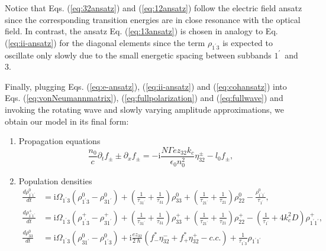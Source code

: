 \documentclass[10pt]{article}
\begin{document}
			Notice that Eqs. (\ref{eq:32ansatz}) and (\ref{eq:12ansatz}) follow the
			electric field ansatz since the corresponding transition energies are in close
			resonance with the optical field. In contrast, the ansatz Eq.
			(\ref{eq:13ansatz}) is chosen in analogy to Eq. (\ref{eq:ii-ansatz}) for the
			diagonal elements since the term $\rho_{1^{\prime}3}$ is expected to oscillate
			only slowly due to the small energetic spacing between subbands $1^{\prime}%
			$\ and $3$.
				
			Finally, plugging Eqs. (\ref{eq:e-ansatz}), (\ref{eq:ii-ansatz}) and
			(\ref{eq:cohansatz}) into Eqs. (\ref{eq:vonNeumannmatrix}),
			(\ref{eq:fullpolarization}) and (\ref{eq:fullwave}) and invoking the rotating
			wave and slowly varying amplitude approximations, we obtain our model in its
			final form:			
\begin{enumerate}
\item {Propagation equations}
\begin{equation}
\frac{n_{0}}{c}\partial_{t}f_{\pm}\pm\partial_{x}f_{\pm}=-\mathrm{i}%
\frac{N\Gamma ez_{32}k_{c}}{\epsilon_{0}n_{0}^{2}}\eta_{32}^{\pm}-l_{0}f_{\pm
}, \label{eq:rtwave}%
\end{equation}
\item { Population densities}%
\begin{subequations}
\label{eq:diagonaldm}%
\begin{align}
\frac{d\rho_{1^{\prime}1^{\prime}}^{0}}{dt} &= \mathrm{i}\Omega_{1^{\prime}%
3}\left(  \rho_{1^{\prime}3}^{0}-\rho_{31^{\prime}}^{0}\right)  +\left(
\frac{1}{\tau_{31^{\prime}}}+\frac{1}{\tau_{31}}\right)  \rho_{33}^{0}+\left(
\frac{1}{\tau_{21^{\prime}}}+\frac{1}{\tau_{21}}\right)  \rho_{22}^{0}%
-\frac{\rho_{1^{\prime}1^{\prime}}^{0}}{\tau_{1^{\prime}}},\label{eq:rho11-dm} \\
\frac{d\rho_{1^{\prime}1^{\prime}}^{+}}{dt} &= \mathrm{i}\Omega_{1^{\prime}%
3}\left(  \rho_{1^{\prime}3}^{+}-\rho_{31^{\prime}}^{+}\right)  +\left(
\frac{1}{\tau_{31^{\prime}}}+\frac{1}{\tau_{31}}\right)  \rho_{33}^{+}+\left(
\frac{1}{\tau_{21^{\prime}}}+\frac{1}{\tau_{21}}\right)  \rho_{22}^{+}-\left(
\frac{1}{\tau_{1^{\prime}}}+4k_{c}^{2}D\right)  \rho_{1^{\prime}1^{\prime}}^{+},\label{eq:rtpop1grating}\\
\frac{d\rho_{33}^{0}}{dt} &= \mathrm{i}\Omega_{1^{\prime}3}\left(
\rho_{31^{\prime}}^{0}-\rho_{1^{\prime}3}^{0}\right)  +\mathrm{i}\frac
{ez_{32}}{2\hslash}\left(  f_{-}^{\ast}\eta_{32}^{-}+f_{+}^{\ast}\eta_{32}%
^{+}-c.c.\right)  +\frac{1}{\tau_{1^{\prime}3}}\rho_{1^{\prime}1^{\prime}}%

\end{align}
\end{subequations}
\end{enumerate}
\end{document}
